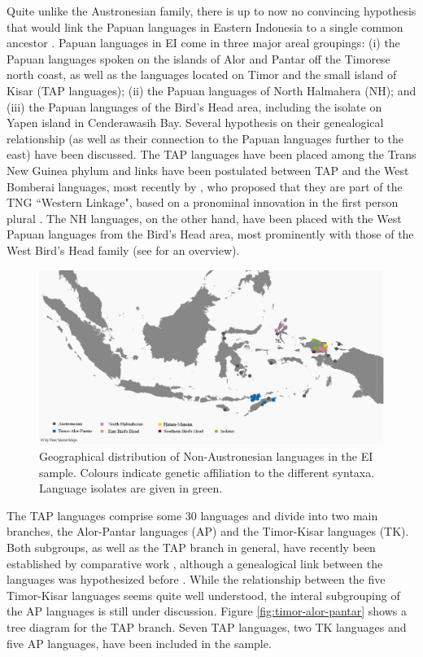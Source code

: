 Quite unlike the Austronesian family, there is up to now no convincing hypothesis that would link the Papuan languages in Eastern Indonesia to a single common ancestor \citep{reesink2005west;klamer2008east}. Papuan languages in EI come in three major areal groupings: (i) the Papuan languages spoken on the islands of Alor and Pantar off the Timorese north coast, as well as the languages located on Timor and the small island of Kisar (\acs{TAP} languages); (ii) the Papuan languages of North Halmahera (NH); and (iii) the Papuan languages of the Bird's Head area, including the isolate  on Yapen island in Cenderawasih Bay. Several hypothesis on their genealogical relationship (as well as their connection to the Papuan languages further to the east) have been discussed. The TAP languages have been placed among the Trans New Guinea phylum and links have been postulated between TAP and the West Bomberai languages, most recently by \citealt{Ross2005}, who proposed that they are part of the TNG ``Western Linkage", based on a pronominal innovation in the first person plural \citep[9]{schapper2014intro}. The NH languages, on the other hand, have been placed with the West Papuan languages from the Bird's Head area, most prominently with those of the West Bird's Head family (see \citealt{reesink2005west} for an overview).

\begin{figure}
\includegraphics[width=\columnwidth]{figures/Map_overview_klein_Papuaff.eps}
\caption[Geographical distribution of Non-Austronesian languages in the sample]{Geographical distribution of Non-Austronesian languages in the EI sample. Colours indicate genetic affiliation to the different syntaxa. Language isolates are given in green.}\label{map:Austro}
\end{figure}

The TAP languages comprise some 30 languages and divide into two main branches, the Alor-Pantar languages (\acs{AP}) and the Timor-Kisar languages (\acs{TK}). Both subgroups, as well as the TAP branch in general, have recently been established by comparative work \citep{holton2012historical;klamer2014alor}, although a genealogical link between the languages was hypothesized before \citep[7]{schapper2014intro}. While the relationship between the five Timor-Kisar languages seems quite well understood, the interal subgrouping of the AP languages is still under discussion. Figure \ref{fig:timor-alor-pantar} shows a tree diagram for the TAP branch. Seven TAP languages, two TK languages and five AP languages, have been included in the sample.

